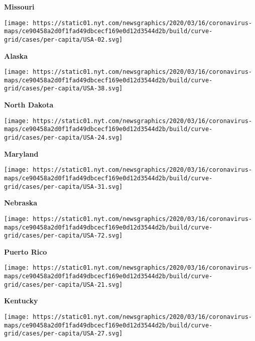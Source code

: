 \textbf{Missouri}

\href{https://www.nytimes.com/interactive/2020/us/alaska-coronavirus-cases.html}{}

\texttt{[image: https://static01.nyt.com/newsgraphics/2020/03/16/coronavirus-maps/ce90458a2d0f1fad49dbcecf169e0d12d3544d2b/build/curve-grid/cases/per-capita/USA-02.svg]}

\textbf{Alaska}

\href{https://www.nytimes.com/interactive/2020/us/north-dakota-coronavirus-cases.html}{}

\texttt{[image: https://static01.nyt.com/newsgraphics/2020/03/16/coronavirus-maps/ce90458a2d0f1fad49dbcecf169e0d12d3544d2b/build/curve-grid/cases/per-capita/USA-38.svg]}

\textbf{North Dakota}

\href{https://www.nytimes.com/interactive/2020/us/maryland-coronavirus-cases.html}{}

\texttt{[image: https://static01.nyt.com/newsgraphics/2020/03/16/coronavirus-maps/ce90458a2d0f1fad49dbcecf169e0d12d3544d2b/build/curve-grid/cases/per-capita/USA-24.svg]}

\textbf{Maryland}

\href{https://www.nytimes.com/interactive/2020/us/nebraska-coronavirus-cases.html}{}

\texttt{[image: https://static01.nyt.com/newsgraphics/2020/03/16/coronavirus-maps/ce90458a2d0f1fad49dbcecf169e0d12d3544d2b/build/curve-grid/cases/per-capita/USA-31.svg]}

\textbf{Nebraska}

\href{https://www.nytimes.com/interactive/2020/us/puerto-rico-coronavirus-cases.html}{}

\texttt{[image: https://static01.nyt.com/newsgraphics/2020/03/16/coronavirus-maps/ce90458a2d0f1fad49dbcecf169e0d12d3544d2b/build/curve-grid/cases/per-capita/USA-72.svg]}

\textbf{Puerto Rico}

\href{https://www.nytimes.com/interactive/2020/us/kentucky-coronavirus-cases.html}{}

\texttt{[image: https://static01.nyt.com/newsgraphics/2020/03/16/coronavirus-maps/ce90458a2d0f1fad49dbcecf169e0d12d3544d2b/build/curve-grid/cases/per-capita/USA-21.svg]}

\textbf{Kentucky}

\href{https://www.nytimes.com/interactive/2020/us/minnesota-coronavirus-cases.html}{}

\texttt{[image: https://static01.nyt.com/newsgraphics/2020/03/16/coronavirus-maps/ce90458a2d0f1fad49dbcecf169e0d12d3544d2b/build/curve-grid/cases/per-capita/USA-27.svg]}

